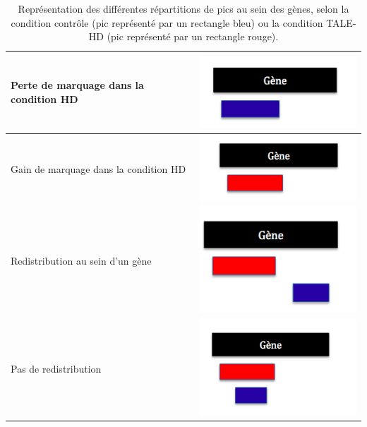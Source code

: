 \documentclass[a4paper,12pt,times]{report}
\newcommand{\scaption}[1]{\caption{\footnotesize{#1}}}
\begin{document}
 \begin{table}[h]
  \begin{tabular}{|p{10cm}| p{5cm}|}
\hline
  Perte de marquage dans la condition HD & 
  \includegraphics[scale=0.4]{perteimg}
   \\
\hline
Gain de marquage dans la condition HD &   \includegraphics[scale=0.4]{gainimg}  \\
\hline
Redistribution au sein d'un gène &  \includegraphics[scale=0.4]{Redis}\\
\hline
Pas de redistribution &  \includegraphics[scale=0.4]{NoRedis}  \\
\hline
\end{tabular}
\scaption{Représentation des différentes répartitions de pics au sein des gènes, selon la condition contrôle (pic représenté par un rectangle bleu) ou la condition TALE-HD (pic représenté par un rectangle rouge).}
\end{table}

\bigskip
\end{document}
